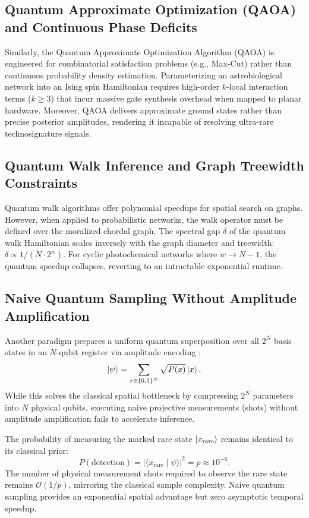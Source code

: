 \subsection{Quantum Approximate Optimization (QAOA) and Continuous Phase Deficits}
Similarly, the Quantum Approximate Optimization Algorithm (QAOA) is engineered for combinatorial satisfaction problems (e.g., Max-Cut) rather than continuous probability density estimation. Parameterizing an astrobiological network into an Ising spin Hamiltonian requires high-order $k$-local interaction terms ($k \ge 3$) that incur massive gate synthesis overhead when mapped to planar hardware. Moreover, QAOA delivers approximate ground states rather than precise posterior amplitudes, rendering it incapable of resolving ultra-rare technosignature signals.

\subsection{Quantum Walk Inference and Graph Treewidth Constraints}
Quantum walk algorithms offer polynomial speedups for spatial search on graphs. However, when applied to probabilistic networks, the walk operator must be defined over the moralized chordal graph. The spectral gap $\delta$ of the quantum walk Hamiltonian scales inversely with the graph diameter and treewidth: $\delta \propto 1 / (N \cdot 2^w)$. For cyclic photochemical networks where $w \to N-1$, the quantum speedup collapses, reverting to an intractable exponential runtime.

\subsection{Naive Quantum Sampling Without Amplitude Amplification}
Another paradigm prepares a uniform quantum superposition over all $2^N$ basis states in an $N$-qubit register via amplitude encoding \cite{low2014}:
\begin{equation}
\left|\psi\right\rangle = \sum_{x \in \{0,1\}^N} \sqrt{P(x)} \left|x\right\rangle.
\end{equation}
While this solves the classical spatial bottleneck by compressing $2^N$ parameters into $N$ physical qubits, executing naive projective measurements (shots) without amplitude amplification fails to accelerate inference.

The probability of measuring the marked rare state $\left|x_{\mathrm{rare}}\right\rangle$ remains identical to its classical prior:
\begin{equation}
P(\text{detection}) = |\langle x_{\mathrm{rare}} \mid \psi \rangle|^2 = p \approx 10^{-6}.
\end{equation}
The number of physical measurement shots required to observe the rare state remains $\mathcal{O}(1/p)$, mirroring the classical sample complexity. Naive quantum sampling provides an exponential spatial advantage but zero asymptotic temporal speedup.

